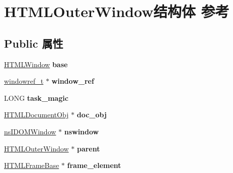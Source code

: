 \hypertarget{struct_h_t_m_l_outer_window}{}\section{H\+T\+M\+L\+Outer\+Window结构体 参考}
\label{struct_h_t_m_l_outer_window}
\subsection*{Public 属性}
\begin{DoxyCompactItemize}
\item 
\mbox{\label{struct_h_t_m_l_outer_window_ac6180d218c7d2b51592baf1dc6ac7a16}} 
\hyperlink{struct_h_t_m_l_window}{H\+T\+M\+L\+Window} {\bfseries base}
\item 
\mbox{\label{struct_h_t_m_l_outer_window_a1862d4c36a7dbcbdeb4037a1e343543d}} 
\hyperlink{structwindowref__t}{windowref\+\_\+t} $\ast$ {\bfseries window\+\_\+ref}
\item 
\mbox{\label{struct_h_t_m_l_outer_window_adc2e8f4db9c768bd756256445874273b}} 
L\+O\+NG {\bfseries task\+\_\+magic}
\item 
\mbox{\label{struct_h_t_m_l_outer_window_ae985d0280a538c2f7d37474aed30a0e7}} 
\hyperlink{struct_h_t_m_l_document_obj}{H\+T\+M\+L\+Document\+Obj} $\ast$ {\bfseries doc\+\_\+obj}
\item 
\mbox{\label{struct_h_t_m_l_outer_window_a8eafaac2fdc437c1857e9c09ddc2046d}} 
\hyperlink{interfacens_i_d_o_m_window}{ns\+I\+D\+O\+M\+Window} $\ast$ {\bfseries nswindow}
\item 
\mbox{\label{struct_h_t_m_l_outer_window_a1199c2f70c8cbfae3d5b7795aca27b33}} 
\hyperlink{struct_h_t_m_l_outer_window}{H\+T\+M\+L\+Outer\+Window} $\ast$ {\bfseries parent}
\item 
\mbox{\label{struct_h_t_m_l_outer_window_a4af1d30c47a18667d3c83c7c4c5aa83a}} 
\hyperlink{struct_h_t_m_l_frame_base}{H\+T\+M\+L\+Frame\+Base} $\ast$ {\bfseries frame\+\_\+element}
\item 

\end{DoxyCompactItemize}
